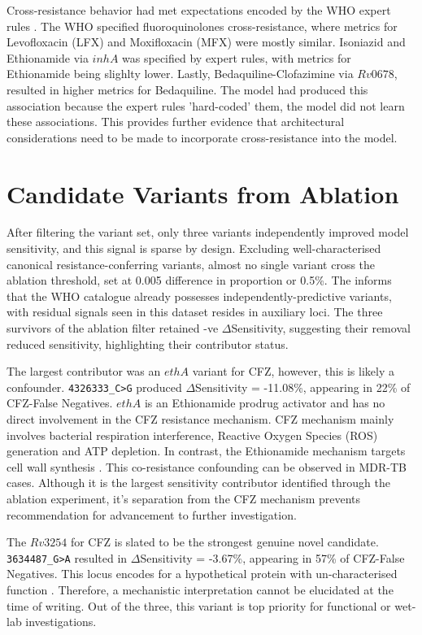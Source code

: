 Cross-resistance behavior had met expectations encoded by the WHO expert rules \cite{WHOcatalog}. The WHO specified fluoroquinolones cross-resistance, where metrics for Levofloxacin (LFX) and Moxifloxacin (MFX) were mostly similar. Isoniazid and Ethionamide via $inhA$ was specified by expert rules, with metrics for Ethionamide being slighlty lower. Lastly, Bedaquiline-Clofazimine via $Rv0678$, resulted in higher metrics for Bedaquiline. The model had produced this association because the expert rules 'hard-coded' them, the model did not learn these associations. This provides further evidence that architectural considerations need to be made to incorporate cross-resistance into the model. 


\section{Candidate Variants from Ablation}

After filtering the variant set, only three variants independently improved model sensitivity, and this signal is sparse by design. Excluding well-characterised canonical resistance-conferring variants, almost no single variant cross the ablation threshold, set at 0.005 difference in proportion or 0.5\%. The informs that the WHO catalogue already possesses independently-predictive variants, with residual signals seen in this dataset resides in auxiliary loci. The three survivors of the ablation filter retained -ve $\Delta$Sensitivity, suggesting their removal reduced sensitivity, highlighting their contributor status. 

The largest contributor was an $ethA$ variant for CFZ, however, this is likely a confounder. \texttt{4326333\_C>G} produced $\Delta$Sensitivity = -11.08\%, appearing in 22\% of CFZ-False Negatives. $ethA$ is an Ethionamide prodrug activator and has no direct involvement in the CFZ resistance mechanism. CFZ mechanism mainly involves bacterial respiration interference, Reactive Oxygen Species (ROS) generation and ATP depletion. In contrast, the Ethionamide mechanism targets cell wall synthesis \cite{Gygblietal2017}. This co-resistance confounding can be observed in MDR-TB cases. Although it is the largest sensitivity contributor identified through the ablation experiment, it's separation from the CFZ mechanism prevents recommendation for advancement to further investigation. 

The $Rv3254$ for CFZ is slated to be the strongest genuine novel candidate. \texttt{3634487\_G>A} resulted in $\Delta$Sensitivity = -3.67\%, appearing in 57\% of CFZ-False Negatives. This locus encodes for a hypothetical protein with un-characterised function \cite{dejesus2017comprehensive}. Therefore, a mechanistic interpretation cannot be elucidated at the time of writing. Out of the three, this variant is top priority for functional or wet-lab investigations. 

